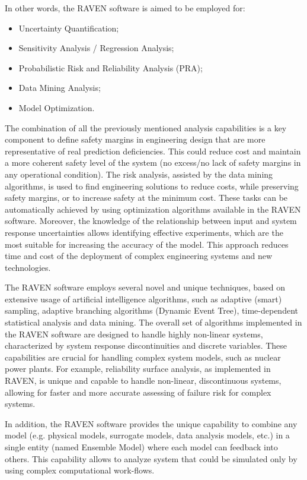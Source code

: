 In other words, the RAVEN software is aimed to be employed for:
\begin{itemize}
  \item Uncertainty Quantification;
  \item Sensitivity Analysis / Regression Analysis;
  \item Probabilistic Risk and Reliability Analysis (PRA);
  \item Data Mining Analysis;
  \item Model Optimization.
\end{itemize}

The combination of all the previously mentioned analysis capabilities is a key component to 
define safety margins in engineering design that are more representative of real prediction deficiencies. 
This could reduce 
cost and maintain a more coherent safety level of the system (no excess/no lack of safety margins in any operational 
condition).
The risk analysis, assisted by the data mining algorithms, is used to find engineering solutions to reduce costs, while 
preserving safety margins, or to increase safety at the minimum cost. These tasks can be automatically achieved by using 
optimization algorithms available in the RAVEN software.
Moreover, the knowledge of the relationship between input and system response uncertainties allows identifying effective 
experiments, which are the most suitable for increasing the accuracy of the model. This approach reduces time and cost 
of the deployment of complex engineering systems and new technologies.

The RAVEN software employs several novel and unique techniques, based on extensive usage of artificial intelligence 
algorithms, such as adaptive (smart) sampling, adaptive branching algorithms (Dynamic Event Tree), time-dependent 
statistical analysis and data mining. 
The overall set of algorithms implemented in the RAVEN software are designed to handle highly non-linear systems, 
characterized by system response discontinuities and discrete variables. These capabilities are crucial for handling 
complex system models, such as nuclear power plants.
For example, reliability surface analysis, as implemented in RAVEN, is unique and capable to handle non-linear, 
discontinuous systems, allowing for faster and more accurate assessing of failure risk for complex systems.

In addition, the RAVEN software provides the unique capability to combine any model (e.g. physical models, surrogate 
models, data analysis models, etc.) in a single entity (named Ensemble Model) where each model can feedback into others. This capability allows to analyze system that could be simulated only by using complex computational work-flows.
